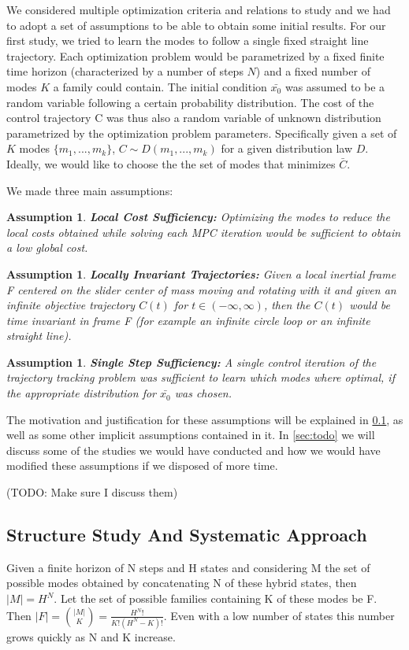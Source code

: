 \documentclass[12,twoside]{TFG-GM}
\newtheorem{assumption}[theorem]{Assumption}
\theoremstyle{definition}
\theoremstyle{remark}
\newcommand*\mean[1]{\bar{#1}}
\newcommand*\diff[1]{\bar{#1}}
\begin{document}
We considered multiple optimization criteria and relations to study and we had to adopt a set of assumptions to be able to obtain some initial results. For our first study, we tried to learn the modes to follow a single fixed straight line trajectory. Each optimization problem would be parametrized by a fixed finite time horizon (characterized by a number of steps $N$) and a fixed number of modes $K$ a family could contain. The initial condition $\diff{x_0}$ was assumed to be a random variable following a certain probability distribution. The cost of the control trajectory C was thus also a random variable of unknown distribution parametrized by the optimization problem parameters. Specifically given a set of $K$ modes $\{m_1, ..., m_k\}$, $C \sim D(m_1, ..., m_k)$ for a given distribution law $D$. Ideally, we would like to choose the the set of modes that minimizes $\mean{C}$.

We made three main assumptions:
\begin{assumption} \label{ass:localcost}
\textbf{Local Cost Sufficiency:} Optimizing the modes to reduce the local costs obtained while solving each MPC iteration would be sufficient to obtain a low global cost.
\end{assumption}
\begin{assumption} \label{ass:localinv}
\textbf{Locally Invariant Trajectories:} Given a local inertial frame F centered on the slider center of mass moving and rotating with it and given an infinite objective trajectory $C(t)$ for $t \in (-\infty, \infty)$, then the $C(t)$ would be time invariant in frame F (for example an infinite circle loop or an infinite straight line).
\end{assumption}
\begin{assumption} \label{ass:singlestep}
\textbf{Single Step Sufficiency:} A single control iteration of the trajectory tracking problem was sufficient to learn which modes where optimal, if the appropriate distribution for $\diff{x_0}$ was chosen.
\end{assumption} 

The motivation and justification for these assumptions will be explained in \ref{subsec:structure}, as well as some other implicit assumptions contained in it. In \ref{sec:todo} we will discuss some of the studies we would have conducted and how we would have modified these assumptions if we disposed of more time.

(TODO: Make sure I discuss them)

\subsection{Structure Study And Systematic Approach}
\label{subsec:structure}
Given a finite horizon of N steps and H states and considering M the set of possible modes obtained by concatenating N of these hybrid states, then $|M| = H^N$. Let the set of possible families containing K of these modes be F. Then $|F| = \binom {|M|}{K} = \frac{H^{N}!}{K!(H^N-K)!}$. Even with a low number of states this number grows quickly as N and K increase.
\end{document}
